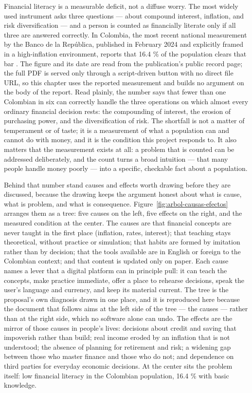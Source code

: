 Financial literacy is a measurable deficit, not a diffuse worry. The most
widely used instrument asks three questions --- about compound interest,
inflation, and risk diversification --- and a person is counted as financially
literate only if all three are answered correctly. In Colombia, the most
recent national measurement by the Banco de la República, published in
February 2024 and explicitly framed in a high-inflation environment, reports
that 16.4 \% of the population clears that bar \parencite{banrep2024financial}.
The figure and its date are read from the publication's public record page;
the full PDF is served only through a script-driven button with no direct file
URL, so this chapter uses the reported measurement and builds no argument on
the body of the report. Read plainly, the number says that fewer than one
Colombian in six can correctly handle the three operations on which almost
every ordinary financial decision rests: the compounding of interest, the
erosion of purchasing power, and the diversification of risk. The shortfall is
not a matter of temperament or of taste; it is a measurement of what a
population can and cannot do with money, and it is the condition this project
responds to. It also matters that the measurement exists at all: a problem
that is counted can be addressed deliberately, and the count turns a broad
intuition --- that many people handle money poorly --- into a specific,
checkable fact about a population.

Behind that number stand causes and effects worth drawing before they are
discussed, because the drawing keeps the argument honest about what is cause,
what is problem, and what is consequence. Figure~\ref{fig:arbol-causas-efectos}
arranges them as a tree: five causes on the left, five effects on the right,
and the measured condition at the center. The causes are that financial
concepts are never taught in the first place (inflation, rates, interest);
that teaching stays theoretical, without practice or simulation; that habits
are formed by imitation rather than by decision; that the tools available are
in English or foreign to the Colombian context; and that content is updated
only on paper. Each cause names a lever that a digital platform can in
principle pull: it can teach the concepts, make practice immediate, offer a
place to rehearse decisions, speak the user's language and currency, and keep
its material current. The tree is the proposal's own diagnosis drawn in one
place, and it is reproduced here because the document that follows aims at the
left side of the tree --- the causes --- rather than at the right side, which
no software alone can undo. The effects are the mirror of those causes in people's
lives: decisions about credit and saving that impoverish rather than build;
real income eroded by an inflation that is not understood; the absence of
planning for retirement and risk; a widening gap between those who master
finance and those who do not; and dependence on third parties for everyday
economic decisions. At the center sits the problem itself: low financial
literacy in the Colombian population, 16.4 \% with basic knowledge.

